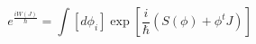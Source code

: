 \begin{equation}
\label{1pi}
e^{\frac{i W(J)}{\hbar}}=\int [d\phi_i] \exp\left[ \frac{i}{\hbar}
 \left( S(\phi) 
+ \phi^t J\right) \right]
\end{equation}

